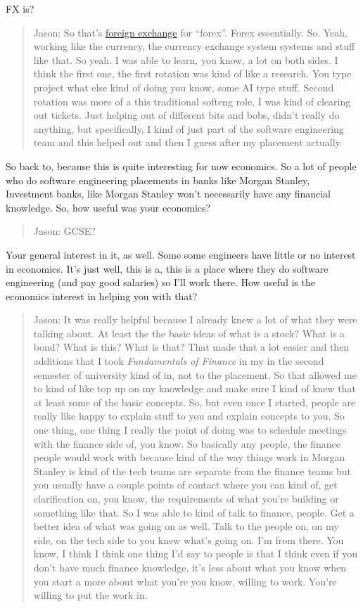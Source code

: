 \documentclass[
]{book}
\begin{document}
FX is?

\begin{quote}
Jason: So that's \href{https://en.wikipedia.org/wiki/Foreign_exchange_market}{foreign exchange} for ``forex''. Forex essentially. So. Yeah, working like the currency, the currency exchange system systems and stuff like that. So yeah. I was able to learn, you know, a lot on both sides. I think the first one, the first rotation was kind of like a research. You type project what else kind of doing you know, some AI type stuff. Second rotation was more of a this traditional softeng role, I was kind of clearing out tickets. Just helping out of different bits and bobs, didn't really do anything, but specifically, I kind of just part of the software engineering team and this helped out and then I guess after my placement actually.
\end{quote}

So back to, because this is quite interesting for now economics. So a lot of people who do software engineering placements in banks like Morgan Stanley, Investment banks, like Morgan Stanley won't necessarily have any financial knowledge. So, how useful was your economics?

\begin{quote}
Jason: GCSE?
\end{quote}

Your general interest in it, as well. Some some engineers have little or no interest in economics. It's just well, this is a, this is a place where they do software engineering (and pay good salaries) so I'll work there. How useful is the economics interest in helping you with that?

\begin{quote}
Jason: It was really helpful because I already knew a lot of what they were talking about. At least the the basic ideas of what is a stock? What is a bond? What is this? What is that? That made that a lot easier and then additions that I took \emph{Fundamentals of Finance} in my in the second semester of university kind of in, not to the placement. So that allowed me to kind of like top up on my knowledge and make sure I kind of knew that at least some of the basic concepts. So, but even once I started, people are really like happy to explain stuff to you and explain concepts to you. So one thing, one thing I really the point of doing was to schedule meetings with the finance side of, you know. So basically any people, the finance people would work with because kind of the way things work in Morgan Stanley is kind of the tech teams are separate from the finance teams but you usually have a couple points of contact where you can kind of, get clarification on, you know, the requirements of what you're building or something like that. So I was able to kind of talk to finance, people. Get a better idea of what was going on as well. Talk to the people on, on my side, on the tech side to you knew what's going on. I'm from there. You know, I think I think one thing I'd say to people is that I think even if you don't have much finance knowledge, it's less about what you know when you start a more about what you're you know, willing to work. You're willing to put the work in.
\end{quote}
\end{document}
